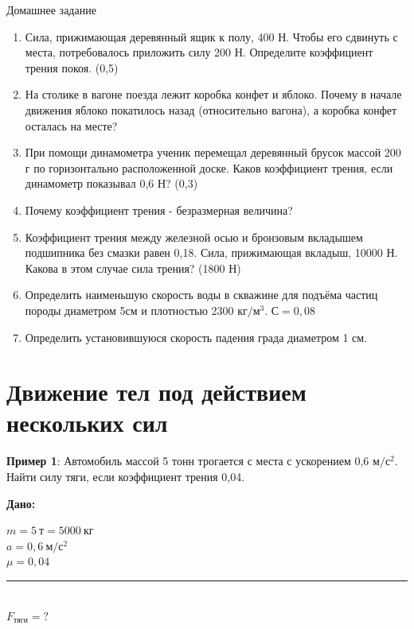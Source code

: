 \documentclass[a6paper, 11pt]{diss_4}
\renewcommand{\'}{\,'}
\begin{document}
\begin{center}
   Домашнее задание
\end{center}
\begin{enumerate}

\item Сила, прижимающая деревянный ящик к полу, 400 Н. Чтобы его сдвинуть с места, потребовалось приложить силу 200 Н. Определите коэффициент трения покоя. (0,5)

\item На столике в вагоне поезда лежит коробка конфет и яблоко. Почему в начале движения яблоко покатилось назад (относительно вагона), а коробка конфет осталась на месте?

\item При помощи динамометра ученик перемещал деревянный брусок массой 200 г по горизонтально расположенной доске. Каков коэффициент трения, если динамометр показывал 0,6 Н? (0,3)

\item Почему коэффициент трения - безразмерная величина?

\item Коэффициент трения между железной осью и бронзовым вкладышем подшипника без смазки равен 0,18. Сила, прижимающая вкладыш, 10000 Н. Какова в этом случае сила трения? (1800 Н)

\item Определить наименьшую скорость воды в скважине для подъёма частиц породы диаметром 5см и плотностью 2300 $кг/м^3$. $С=0,08$

\item Определить установившуюся скорость падения града диаметром 1 см.
\end{enumerate}


\section{Движение тел под действием нескольких сил}

\textbf{Пример 1}: Автомобиль массой 5 тонн трогается с места с ускорением 0,6 $м/с^2.$
Найти силу тяги, если коэффициент трения 0,04.

\hspace{1cm}\textbf{Дано:}\hspace{.3cm}
\parbox[t]{4cm}{
$m = 5\ т=5000\ кг$\\
$a = 0,6\ м/с^2$\\
$\mu = 0,04$\\
\rule{4cm}{.4pt}\\
$F_{тяги} = ?$\\
}
\end{document}
